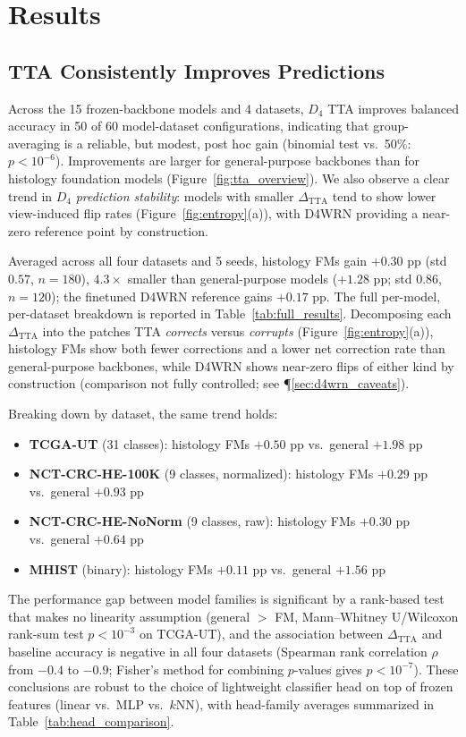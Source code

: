 \documentclass{melba}
\begin{document}
\section{Results}
\label{sec:results}
\subsection{TTA Consistently Improves Predictions}
Across the 15 frozen-backbone models and 4 datasets, $D_4$ TTA improves balanced accuracy in 50 of 60 model-dataset configurations, indicating that group-averaging is a reliable, but modest, post hoc gain (binomial test vs.\ 50\%: $p < 10^{-6}$). Improvements are larger for general-purpose backbones than for histology foundation models (Figure~\ref{fig:tta_overview}). We also observe a clear trend in $D_4$ \emph{prediction stability}: models with smaller $\Delta_{\text{TTA}}$ tend to show lower view-induced flip rates (Figure~\ref{fig:entropy}(a)), with D4WRN providing a near-zero reference point by construction.

Averaged across all four datasets and 5 seeds, histology FMs gain $+0.30$ pp (std $0.57$, $n=180$), $4.3\times$ smaller than general-purpose models ($+1.28$ pp; std $0.86$, $n=120$); the finetuned D4WRN reference gains $+0.17$ pp. The full per-model, per-dataset breakdown is reported in Table~\ref{tab:full_results}. Decomposing each $\Delta_{\text{TTA}}$ into the patches TTA \emph{corrects} versus \emph{corrupts} (Figure~\ref{fig:entropy}(a)), histology FMs show both fewer corrections and a lower net correction rate than general-purpose backbones, while D4WRN shows near-zero flips of either kind by construction (comparison not fully controlled; see \P\ref{sec:d4wrn_caveats}).

Breaking down by dataset, the same trend holds:
\begin{itemize}
  \item \textbf{TCGA-UT} (31 classes): histology FMs $+0.50$ pp vs.\ general $+1.98$ pp
  \item \textbf{NCT-CRC-HE-100K} (9 classes, normalized): histology FMs $+0.29$ pp vs.\ general $+0.93$ pp
  \item \textbf{NCT-CRC-HE-NoNorm} (9 classes, raw): histology FMs $+0.30$ pp vs.\ general $+0.64$ pp
  \item \textbf{MHIST} (binary): histology FMs $+0.11$ pp vs.\ general $+1.56$ pp
\end{itemize}
The performance gap between model families is significant by a rank-based test that makes no linearity assumption (general $>$ FM, Mann--Whitney U/Wilcoxon rank-sum test $p < 10^{-3}$ on TCGA-UT), and the association between $\Delta_{\text{TTA}}$ and baseline accuracy is negative in all four datasets (Spearman rank correlation $\rho$ from $-0.4$ to $-0.9$; Fisher's method for combining $p$-values gives $p < 10^{-7}$). These conclusions are robust to the choice of lightweight classifier head on top of frozen features (linear vs.\ MLP vs.\ $k$NN), with head-family averages summarized in Table~\ref{tab:head_comparison}.
\end{document}

